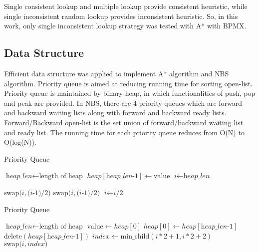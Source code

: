 \documentclass[twocolumn]{article}
\begin{document}
Single consistent lookup and multiple lookup provide consistent heuristic, while single inconsistent random lookup provides inconsistent heuristic. So, in this work, only single inconsistent lookup strategy was tested with A* with BPMX.


\subsection{Data Structure}
Efficient data structure was applied to implement A* algorithm and NBS algorithm. Priority queue is aimed at reducing running time for sorting open-list. Priority queue is maintained by binary heap, in which functionalities of push, pop and peak are provided. In NBS, there are 4 priority queues which are forward and backward waiting lists along with forward and backward ready lists. Forward/Backward open-list is the set union of forward/backward waiting list and ready list. The running time for each priority queue reduces from O(N) to O(log(N)).


\begin{algorithm}
\caption{Priority Queue}\label{euclid}
\begin{algorithmic}[1]
\State $ \textit{heap\_len} \gets \text{length of heap}$
\State $ heap[\textit{heap\_len-1}] \gets \text{value} $
\State $ \textit{i} \gets \textit{heap\_len} $

\State $\text{swap(} \textit{i}, \textit{(i-1)/2})$
\EndIf
{} 
        \State $\text{swap(} \textit{i}, \textit{(i-1)/2})$
    \EndIf
\EndIf
\State $ \textit{i} \gets \textit{i/2} $
\EndWhile
\EndProcedure
\end{algorithmic}
\end{algorithm}


\begin{algorithm}
\caption{Priority Queue}\label{euclid}
\begin{algorithmic}[1]

\State $ \textit{heap\_len} \gets \text{length of heap}$
\State $ \text{value} \gets  heap[0] $
\State $ heap[0] \gets  heap[\textit{heap\_len-1}]  $
\State $ \text{delete} (heap[\textit{heap\_len-1}]) $
\State $ \textit{index} \gets  \text{min\_child}(i*2+1, i*2+2) $
\State $\text{swap(} \textit{i}, \textit{index})$
\EndIf
\EndWhile
\EndProcedure
\end{algorithmic}
\end{algorithm}
\end{document}

